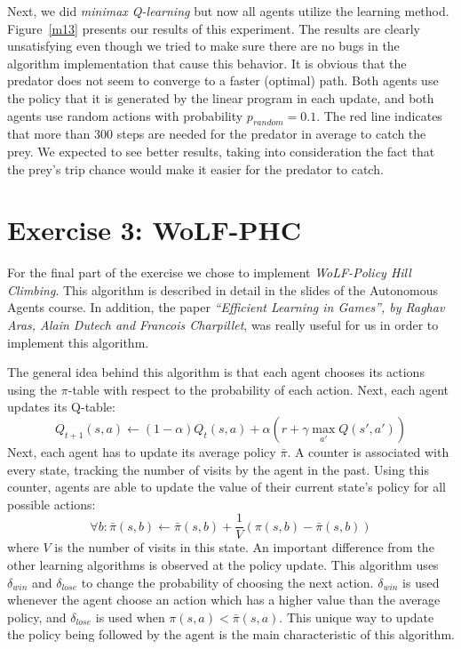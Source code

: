 \documentclass[a4paper,11pt]{article}
\begin{document}
Next, we did \textit{minimax Q-learning} but now all agents utilize the learning method. Figure~\ref{m13}  presents our results of this experiment. The results are clearly unsatisfying even though we tried to make sure there are no bugs in the algorithm implementation that cause this behavior. It is obvious that the predator does not seem to converge to a faster (optimal) path. Both agents use the policy that it is generated by the linear program in each update, and both agents use random actions with probability $p_{random} = 0.1$. The red line indicates that more than 300 steps are needed for the predator in average to catch the prey. %
We expected to see better results, taking into consideration the fact that the prey's trip chance would make it easier for the predator to catch.


\section{Exercise 3: WoLF-PHC}
For the final part of the exercise we chose to implement \textit{WoLF-Policy Hill Climbing}. This algorithm is described in detail in the slides of the Autonomous Agents course. In addition, the paper \textit{``Efficient Learning in Games'', by Raghav Aras, Alain Dutech and Francois Charpillet}, was really useful for us in order to implement this algorithm.

The general idea behind this algorithm is that each agent chooses its actions using the $\pi$-table with respect to the probability of each action. Next, each agent updates its Q-table:
\[
Q_{t+1}(s,a) \leftarrow (1-\alpha)Q_{t}(s,a)+\alpha(r + \gamma \max_{a'}Q(s',a'))
\]
Next, each agent has to update its average policy $\bar\pi$. A counter is associated with every state, tracking the number of visits by the agent in the past. Using this counter, agents are able to update the value of their current state's policy for all possible actions:
\[
 \forall b : \bar{\pi}(s,b) \leftarrow \bar{\pi}(s,b) + \frac{1}{V} (\pi(s,b) - \bar{\pi}(s,b))
\]
where $V$ is the number of visits in this state. An important difference from the other learning algorithms is observed at the policy update. This algorithm uses $\delta_{win}$ and $\delta_{lose}$ to change the probability of choosing the next action. $\delta_{win}$ is used whenever the agent choose an action which has a higher value than the average policy, and $\delta_{lose}$ is used when $\pi(s,a) < \bar\pi(s,a)$. This unique way to update the policy being followed by the agent is the main characteristic of this algorithm.
\end{document}
